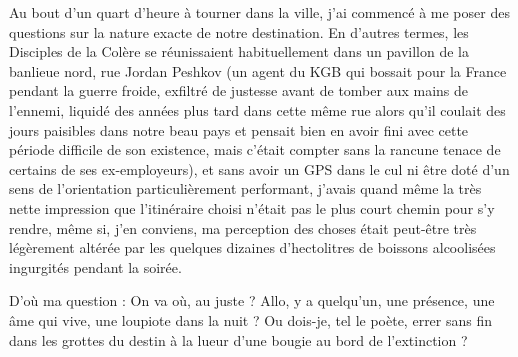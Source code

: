 
Au bout d’un quart d’heure à tourner dans la ville, j’ai commencé à me poser des questions sur la nature exacte de notre destination. En d’autres termes, les Disciples de la Colère se réunissaient habituellement dans un pavillon de la banlieue nord, rue Jordan Peshkov (un agent du KGB qui bossait pour la France pendant la guerre froide, exfiltré de justesse avant de tomber aux mains de l’ennemi, liquidé des années plus tard dans cette même rue alors qu’il coulait des jours paisibles dans notre beau pays et pensait bien en avoir fini avec cette période difficile de son existence, mais c’était compter sans la rancune tenace de certains de ses ex-employeurs), et sans avoir un GPS dans le cul ni être doté d’un sens de l’orientation particulièrement performant, j’avais quand même la très nette impression que l’itinéraire choisi n’était pas le plus court chemin pour s’y rendre, même si, j’en conviens, ma perception des choses était peut-être très légèrement altérée par les quelques dizaines d’hectolitres de boissons alcoolisées ingurgités pendant la soirée.

\label{rat:21}%
D’où ma question : On va où, au juste ? Allo, y a quelqu’un, une présence, une âme qui vive, une loupiote dans la nuit ? Ou dois-je, tel le poète, errer sans fin dans les grottes du destin à la lueur d’une bougie au bord de l’extinction ?

